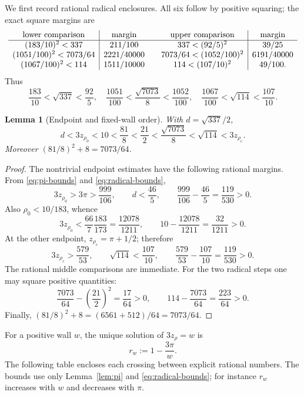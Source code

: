\documentclass[11pt]{article}
\newtheorem{lemma}[theorem]{Lemma}
\theoremstyle{definition}
\theoremstyle{remark}
\newcommand{\rhoc}{\rho_{c}}
\newcommand{\rhozero}{\rho_{0}}
\begin{document}
We first record rational radical enclosures.  All six follow by positive
squaring; the exact square margins are
\[
\begin{array}{c|c@{\qquad}c|c}
\text{lower comparison}&\text{margin}&\text{upper comparison}&\text{margin}\\ \hline
(183/10)^2<337&211/100&337<(92/5)^2&39/25\\
(1051/100)^2<7073/64&2221/40000&7073/64<(1052/100)^2&6191/40000\\
(1067/100)^2<114&1511/10000&114<(107/10)^2&49/100.
\end{array}
\]
Thus
\begin{equation}
 \frac{183}{10}<\sqrt{337}<\frac{92}{5},\quad
 \frac{1051}{100}<\frac{\sqrt{7073}}8<\frac{1052}{100},\quad
 \frac{1067}{100}<\sqrt{114}<\frac{107}{10}.
 \label{eq:radical-bounds}
\end{equation}

\begin{lemma}[Endpoint and fixed-wall order]
\label{lem:fixed-order}
With \(d=\sqrt{337}/2\),
\begin{equation}
 d<3z_{\rhozero}<10<\frac{81}{8}<\frac{21}{2}
 <\frac{\sqrt{7073}}8<\sqrt{114}<3z_{\rhoc}.
 \label{eq:full-fixed-order}
\end{equation}
Moreover
\((81/8)^2+8=7073/64\).
\end{lemma}

\begin{proof}
The nontrivial endpoint estimates have the following rational margins.
From \eqref{eq:pi-bounds} and \eqref{eq:radical-bounds},
\[
 3z_{\rhozero}>3\pi>\frac{999}{106},
 \qquad d<\frac{46}{5},
 \qquad
 \frac{999}{106}-\frac{46}{5}=\frac{119}{530}>0.
\]
Also \(\rhozero<10/183\), whence
\[
 3z_{\rhozero}
 <\frac{66}{7}\frac{183}{173}
 =\frac{12078}{1211},
 \qquad
 10-\frac{12078}{1211}=\frac{32}{1211}>0.
\]
At the other endpoint, \(z_{\rhoc}=\pi+1/2\); therefore
\[
 3z_{\rhoc}>\frac{579}{53},
 \qquad
 \sqrt{114}<\frac{107}{10},
 \qquad
 \frac{579}{53}-\frac{107}{10}=\frac{119}{530}>0.
\]
The rational middle comparisons are immediate.  For the two radical
steps one may square positive quantities:
\[
 \frac{7073}{64}-\left(\frac{21}{2}\right)^2=\frac{17}{64}>0,
 \qquad
 114-\frac{7073}{64}=\frac{223}{64}>0.
\]
Finally,
\((81/8)^2+8=(6561+512)/64=7073/64\).
\end{proof}

For a positive wall \(w\), the unique solution of \(3z_\rho=w\) is
\[
 r_w:=1-\frac{3\pi}{w}.
\]
The following table encloses each crossing between explicit rational
numbers.  The bounds use only Lemma~\ref{lem:pi} and
\eqref{eq:radical-bounds}; for instance \(r_w\) increases with \(w\) and
decreases with \(\pi\).
\end{document}

